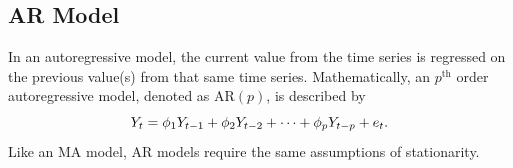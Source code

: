 \documentclass[12pt, centerh1]{article}
\begin{document}
\subsection{AR Model}
In an autoregressive model, the current value from the time series is regressed on the previous value(s) from that same time series. Mathematically, an $p^{\text{th}}$ order autoregressive model, denoted as AR$(p)$, is described by
\begin{equation}\label{eq:AR}
    \centering
    Y_t = \phi_1Y_{t-1} + \phi_2Y_{t-2} + \cdots + \phi_pY_{t-p} + e_t.
\end{equation} 
Like an MA model, AR models require the same assumptions of stationarity.
\end{document}
